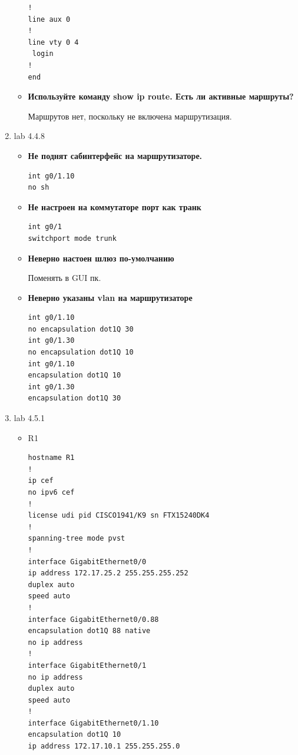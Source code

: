 \documentclass[a4paper,14pt]{extarticle}
\begin{document}
\begin{enumerate}
\begin{itemize}
\begin{lstlisting}
!
line aux 0
!
line vty 0 4
 login
!
end
                \end{lstlisting}
            \item \textbf{Используйте команду show ip route. Есть ли активные маршруты?}\par
                Маршрутов нет, поскольку не включена маршрутизация.
        \end{itemize}
        \item lab 4.4.8
        \begin{itemize}
            \item \textbf{Не поднят сабинтерфейс на маршрутизаторе.}\par
                \begin{lstlisting}
int g0/1.10
no sh
                \end{lstlisting}
            \item \textbf{Не настроен на коммутаторе порт как транк}\par
                \begin{lstlisting}
int g0/1
switchport mode trunk
                \end{lstlisting}
            \item \textbf{Неверно настоен шлюз по-умолчанию}\par
                Поменять в GUI пк.
            \item \textbf{Неверно указаны vlan на маршрутизаторе}\par
                \begin{lstlisting}
int g0/1.10
no encapsulation dot1Q 30
int g0/1.30
no encapsulation dot1Q 10
int g0/1.10
encapsulation dot1Q 10
int g0/1.30
encapsulation dot1Q 30
                \end{lstlisting}
        \end{itemize}
        \newpage
        \item lab 4.5.1
        \begin{itemize}
            \item R1
                \begin{lstlisting}
hostname R1
!
ip cef
no ipv6 cef
!
license udi pid CISCO1941/K9 sn FTX15240DK4
!
spanning-tree mode pvst
!
interface GigabitEthernet0/0
ip address 172.17.25.2 255.255.255.252
duplex auto
speed auto
!
interface GigabitEthernet0/0.88
encapsulation dot1Q 88 native
no ip address
!
interface GigabitEthernet0/1
no ip address
duplex auto
speed auto
!
interface GigabitEthernet0/1.10
encapsulation dot1Q 10
ip address 172.17.10.1 255.255.255.0

\end{lstlisting}
\end{itemize}
\end{enumerate}
\end{document}
